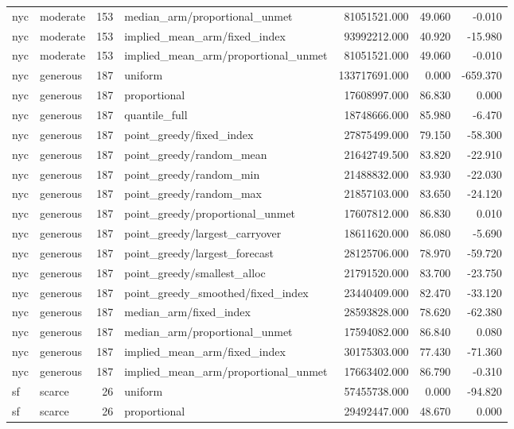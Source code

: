 \begin{tabular}{llrlrrr}
nyc & moderate & 153 & median\_arm/proportional\_unmet & 81051521.000 & 49.060 & -0.010 \\
nyc & moderate & 153 & implied\_mean\_arm/fixed\_index & 93992212.000 & 40.920 & -15.980 \\
nyc & moderate & 153 & implied\_mean\_arm/proportional\_unmet & 81051521.000 & 49.060 & -0.010 \\
nyc & generous & 187 & uniform & 133717691.000 & 0.000 & -659.370 \\
nyc & generous & 187 & proportional & 17608997.000 & 86.830 & 0.000 \\
nyc & generous & 187 & quantile\_full & 18748666.000 & 85.980 & -6.470 \\
nyc & generous & 187 & point\_greedy/fixed\_index & 27875499.000 & 79.150 & -58.300 \\
nyc & generous & 187 & point\_greedy/random\_mean & 21642749.500 & 83.820 & -22.910 \\
nyc & generous & 187 & point\_greedy/random\_min & 21488832.000 & 83.930 & -22.030 \\
nyc & generous & 187 & point\_greedy/random\_max & 21857103.000 & 83.650 & -24.120 \\
nyc & generous & 187 & point\_greedy/proportional\_unmet & 17607812.000 & 86.830 & 0.010 \\
nyc & generous & 187 & point\_greedy/largest\_carryover & 18611620.000 & 86.080 & -5.690 \\
nyc & generous & 187 & point\_greedy/largest\_forecast & 28125706.000 & 78.970 & -59.720 \\
nyc & generous & 187 & point\_greedy/smallest\_alloc & 21791520.000 & 83.700 & -23.750 \\
nyc & generous & 187 & point\_greedy\_smoothed/fixed\_index & 23440409.000 & 82.470 & -33.120 \\
nyc & generous & 187 & median\_arm/fixed\_index & 28593828.000 & 78.620 & -62.380 \\
nyc & generous & 187 & median\_arm/proportional\_unmet & 17594082.000 & 86.840 & 0.080 \\
nyc & generous & 187 & implied\_mean\_arm/fixed\_index & 30175303.000 & 77.430 & -71.360 \\
nyc & generous & 187 & implied\_mean\_arm/proportional\_unmet & 17663402.000 & 86.790 & -0.310 \\
sf & scarce & 26 & uniform & 57455738.000 & 0.000 & -94.820 \\
sf & scarce & 26 & proportional & 29492447.000 & 48.670 & 0.000 \\

\end{tabular}
